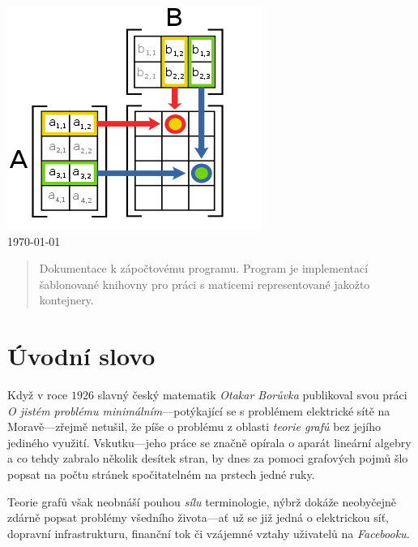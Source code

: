 \documentclass[11pt,a4paper]{article}
\begin{document}
\begin{titlepage}
\begin{center}
\vfill
\includegraphics[viewport=140 15 150 65,scale=0.75]{./front.png}\\[1cm]    

{\large \today}

\end{center}

\end{titlepage}


\begin{abstract}
Dokumentace k zápočtovému programu.
Program je implementací šablonované knihovny pro práci s maticemi
representované jakožto kontejnery.
\end{abstract}

\pagebreak

\tableofcontents

\pagebreak

\part{Úvodní slovo}
Když v roce $1926$ slavný český matematik {\sl Otakar Borůvka\/} publikoval
  svou práci {\sl O jistém problému minimálním\/}---potýkající se s problémem
  elektrické sítě na Moravě---zřejmě netušil, že píše o problému z oblasti {\sl
  teorie grafů\/} bez jejího jediného využití.
Vskutku---jeho práce se značně opírala o aparát lineární algebry a co tehdy
  zabralo několik desítek stran, by dnes za pomoci grafových pojmů šlo popsat
  na počtu stránek spočitatelném na prstech jedné ruky.

Teorie grafů však neobnáší pouhou {\sl sílu\/} terminologie, nýbrž dokáže
  neoby\-čejně zdárně popsat problémy všedního života---ať už se již jedná o
  elektrickou síť, dopravní infrastrukturu, finanční tok či vzájemné vztahy
  uživatelů na {\sl Facebooku\/}.
\end{document}
